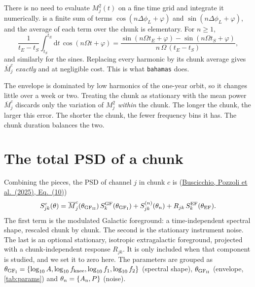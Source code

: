 \documentclass[11pt,a4paper]{article}
\newcommand{\urlPone}{https://arxiv.org/pdf/2511.03604}
\newcommand{\PoneEq}[1]{\href{\urlPone}{Buscicchio, Pozzoli et al.~(2025), Eq.~(#1)}}
\newcommand{\dd}{\mathrm{d}}
\newcommand{\Mbar}{\overline{M}}
\begin{document}
There is no need to evaluate $M_j^2(t)$ on a fine time grid and integrate it
numerically.  is a finite sum of terms $\cos(n\Delta\phi_L+\varphi)$ and
$\sin(n\Delta\phi_L+\varphi)$, and the average of each term over the chunk is
elementary. For $n\geq1$,
\begin{equation}
  \frac{1}{t_E-t_S}\int_{t_S}^{t_E}\dd t\,\cos(n\Omega t+\varphi)
  = \frac{\sin(n\Omega t_E+\varphi)-\sin(n\Omega t_S+\varphi)}{n\,\Omega\,(t_E-t_S)},
\end{equation}
and similarly for the sines. Replacing every harmonic by its chunk average gives
$\Mbar^c_j$ \emph{exactly} and at negligible cost. This is what \texttt{bahamas}
does.

\begin{remark}
The envelope is dominated by low harmonics of the one-year orbit, so it changes
little over a week or two. Treating the chunk as stationary with the mean power
$\Mbar^c_j$ discards only the variation of $M^2_j$ \emph{within} the chunk. The
longer the chunk, the larger this error. The shorter the chunk, the fewer frequency
bins it has. The chunk duration balances the two.
\end{remark}

\section{The total PSD of a chunk}\label{sec:psd}

Combining the pieces, the PSD of channel $j$ in chunk $c$ is (\PoneEq{10})
\begin{equation}
  S^c_{jk}(\theta) = \Mbar^c_j(\theta_{\rm GF_{II}})\, S^{\rm GF}_k(\theta_{\rm GF_I})
  + S^{(n)}_{jk}(\theta_n) + R_{jk}\, S^{\rm EF}_k(\theta_{\rm EF}).
  \label{eq:psd}
\end{equation}
The first term is the modulated Galactic foreground: a time-independent spectral
shape, rescaled chunk by chunk. The second is the stationary instrument noise. The
last is an optional stationary, isotropic extragalactic foreground, projected with a
chunk-independent response $R_{jk}$. It is only included when that component is
studied, and we set it to zero here. The parameters are grouped as
$\theta_{\rm GF_I}=\{\log_{10}A,\log_{10}f_{\rm knee},\log_{10}f_1,\log_{10}f_2\}$
(spectral shape), $\theta_{\rm GF_{II}}$ (envelope, \cref{tab:params}) and
$\theta_n=\{A_{\rm n},P\}$ (noise).
\end{document}
